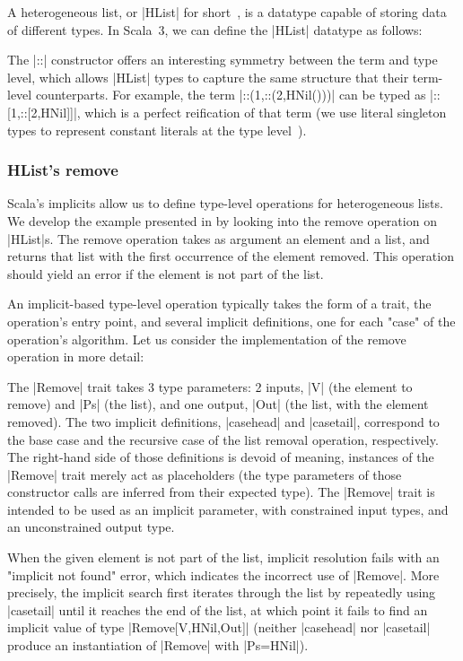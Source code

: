 A heterogeneous list, or |HList| for short~\citep{kiselyov2004strongly}, is a datatype capable of storing data of different types.
In Scala~3, we can define the |HList| datatype as follows:

\hlistEnumDefinition

\noindent
The |::| constructor offers an interesting symmetry between the term and type level, which allows |HList| types to capture the same structure that their term-level counterparts.
For example, the term |::(1,::(2,HNil()))| can be typed as |::[1,::[2,HNil]]|, which is a perfect reification of that term (we use literal singleton types to represent constant literals at the type level~\citep{leontiev2014sip}).

\subsubsection{HList's remove}
\label{sec:hlists-remove}

Scala's implicits allow us to define type-level operations for heterogeneous lists.
We develop the example presented in  by looking into the remove operation on |HList|s.
The remove operation takes as argument an element and a list, and returns that list with the first occurrence of the element removed.
This operation should yield an error if the element is not part of the list.

An implicit-based type-level operation typically takes the form of a trait, the operation's entry point, and several implicit definitions, one for each "case" of the operation's algorithm.
Let us consider the implementation of the remove operation in more detail:

\memImplicitRemove

\noindent
The |Remove| trait takes 3 type parameters: 2 inputs, |V| (the element to remove) and |Ps| (the list), and one output, |Out| (the list, with the element removed).
The two implicit definitions, |casehead| and |casetail|, correspond to the base case and the recursive case of the list removal operation, respectively.
The right-hand side of those definitions is devoid of meaning, instances of the |Remove| trait merely act as placeholders (the type parameters of those constructor calls are inferred from their expected type).
The |Remove| trait is intended to be used as an implicit parameter, with constrained input types, and an unconstrained output type.

When the given element is not part of the list, implicit resolution fails with an "implicit not found" error, which indicates the incorrect use of |Remove|.
More precisely, the implicit search first iterates through the list by repeatedly using |casetail| until it reaches the end of the list, at which point it fails to find an implicit value of type |Remove[V,HNil,Out]| (neither |casehead| nor |casetail| produce an instantiation of |Remove| with |Ps=HNil|).

